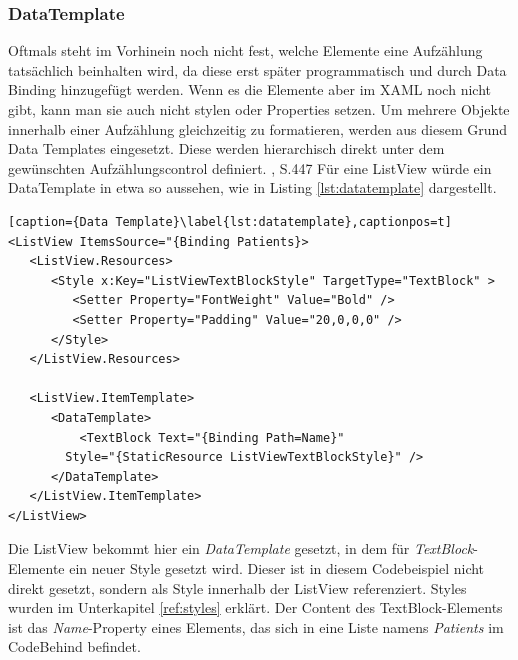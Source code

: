 \documentclass[a4paper,bibtotoc,oneside]{scrbook}
\begin{document}
\subsubsection[DataTemplate]{DataTemplate}\label{ref:datatemplate}
Oftmals steht im Vorhinein noch nicht fest, welche Elemente eine Aufzählung tatsächlich beinhalten wird, da diese erst später programmatisch und durch Data Binding hinzugefügt werden. Wenn es die Elemente aber im XAML noch nicht gibt, kann man sie auch nicht stylen oder Properties setzen.
\newline
\newline
Um mehrere Objekte innerhalb einer Aufzählung gleichzeitig zu formatieren, werden aus diesem Grund Data Templates eingesetzt. Diese werden hierarchisch direkt unter dem gewünschten Aufzählungscontrol definiert. \cite{ana12}, S.447
\newline
\newline
Für eine ListView würde ein DataTemplate in etwa so aussehen, wie in Listing \ref{lst:datatemplate} dargestellt.
\begin{lstlisting}[caption={Data Template}\label{lst:datatemplate},captionpos=t]
<ListView ItemsSource="{Binding Patients}>
   <ListView.Resources>
      <Style x:Key="ListViewTextBlockStyle" TargetType="TextBlock" >
         <Setter Property="FontWeight" Value="Bold" />
         <Setter Property="Padding" Value="20,0,0,0" />                         
      </Style>
   </ListView.Resources>

   <ListView.ItemTemplate>
      <DataTemplate>
          <TextBlock Text="{Binding Path=Name}"
		Style="{StaticResource ListViewTextBlockStyle}" />
      </DataTemplate>
   </ListView.ItemTemplate>
</ListView>
\end{lstlisting}
Die ListView bekommt hier ein \textit{DataTemplate} gesetzt, in dem für \textit{TextBlock}-Elemente ein neuer Style gesetzt wird. Dieser ist in diesem Codebeispiel nicht direkt gesetzt, sondern als Style innerhalb der ListView referenziert. Styles wurden im Unterkapitel \ref{ref:styles} erklärt. Der Content des TextBlock-Elements ist das \textit{Name}-Property eines Elements, das sich in eine Liste namens \textit{Patients} im CodeBehind befindet.
\end{document}
